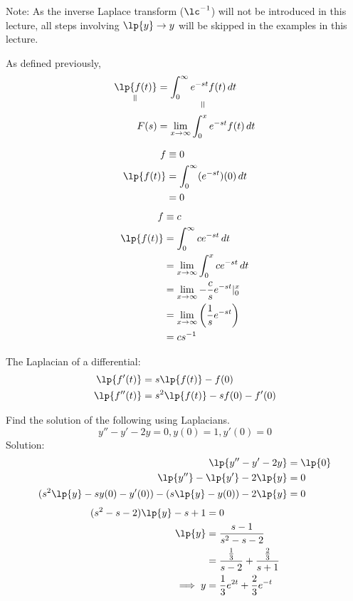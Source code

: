 \documentclass[twoside]{report}
\begin{document}
    Note: As the inverse Laplace transform ($\lc^{-1}$) will not be introduced in this lecture, all steps involving $\lp{y} \to y$ will be skipped in the examples in this lecture.

    As defined previously,
    \begin{alignat*}{2} %
        \underset{\rotatebox{90}{$\,=$}}{\lp{f(t)}} &= \underset{\rotatebox{90}{$\,=$}}{\int_{0}^{\infty}e^{-st}f(t)\,dt}\\
        F(s) &= \lim_{x\to\infty}\int_{0}^{x}e^{-st}f(t)\,dt
    \end{alignat*}
    \begin{example}
        \begin{alignat}{1}
            f &\equiv 0\\
            \lp{f(t)} &= \int_{0}^{\infty}(e^{-st})(0)\,dt\\
            &= 0
        \end{alignat}
        \begin{alignat}{1}
            f &\equiv c\\
            \lp{f(t)} &= \int_{0}^{\infty}ce^{-st}\,dt\\
            &= \lim_{x\to\infty}\int_{0}^{x}ce^{-st}\,dt\\
            &= \lim_{x\to\infty}-\frac{c}{s}e^{-st}|_{0}^{x}\\
            &= \lim_{x\to\infty}\left(\frac{1}{s}e^{-st}\right)\\
            &= cs^{-1}
        \end{alignat}
    \end{example}
    \begin{btheorem}
        The Laplacian of a differential:
        \begin{alignat}{1}
            \lp{f'(t)} &= s\lp{f(t)} - f(0)\\
            \lp{f''(t)} &= s^{2}\lp{f(t)}-sf(0)-f'(0)
        \end{alignat}
    \end{btheorem}
    \begin{example}
        Find the solution of the following using Laplacians.
        \begin{equation}
            y'' - y' -2y = 0, y(0) = 1, y'(0) = 0
        \end{equation}
        Solution:
        \begin{alignat}{1}
            \lp{y'' - y' - 2y} &= \lp{0}\\
            \lp{y''} - \lp{y'} - 2\lp{y} &= 0\\
            (s^{2}\lp{y} - sy(0) - y'(0)) - (s\lp{y} - y(0)) - 2\lp{y} &= 0
        \end{alignat}
        \begin{alignat}{1}
            (s^{2} - s - 2)\lp{y} - s + 1 &= 0\\
            \lp{y} &= \frac{s - 1}{s^{2} - s - 2}\\
            &= \frac{\frac{1}{3}}{s-2} + \frac{\frac{2}{3}}{s+1}\\
            \implies y &= \frac{1}{3}e^{2t} + \frac{2}{3}e^{-t}
        \end{alignat}
    \end{example}
\end{document}
